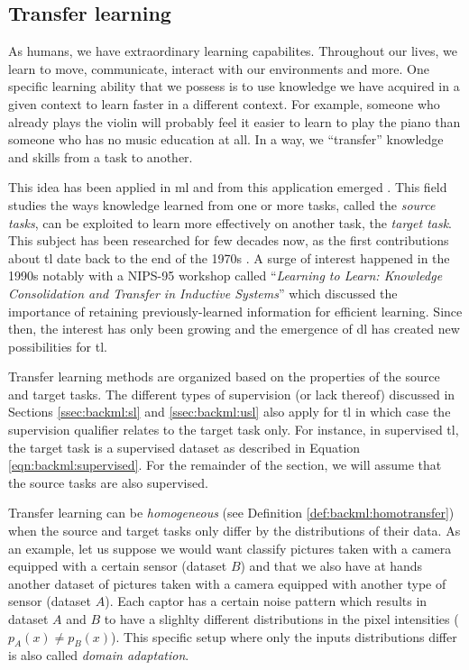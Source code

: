 \subsection{Transfer learning}
\label{ssec:backml:transfer}

As humans, we have extraordinary learning capabilites. Throughout our lives, we learn to move, communicate, interact with our environments and more. One specific learning ability that we possess is to use knowledge we have acquired in a given context to learn faster in a different context. For example, someone who already plays the violin will probably feel it easier to learn to play the piano than someone who has no music education at all. In a way, we ``transfer'' knowledge and skills from a task to another. 

This idea has been applied in \acrlong{ml} and from this application emerged  \parencite{yang2020transfer}. This field studies the ways knowledge learned from one or more tasks, called the \textit{source tasks}, can be exploited to learn more effectively on another task, the \textit{target task}. This subject has been researched for few decades now, as the first contributions about \acrlong{tl} date back to the end of the 1970s \parencite{bozinovski2020reminder}. A surge of interest happened in the 1990s notably with a NIPS-95 workshop called ``\textit{Learning to Learn: Knowledge Consolidation and Transfer in Inductive Systems}'' which discussed the importance of retaining previously-learned information for efficient learning. Since then, the interest has only been growing and the emergence of \acrlong{dl} has created new possibilities for \acrlong{tl}. 

Transfer learning methods are organized based on the properties of the source and target tasks. The different types of supervision (or lack thereof) discussed in Sections \ref{ssec:backml:sl} and \ref{ssec:backml:usl} also apply for \acrlong{tl} in which case the supervision qualifier relates to the target task only. For instance, in supervised \acrlong{tl}, the target task is a supervised dataset as described in Equation \ref{eqn:backml:supervised}. For the remainder of the section, we will assume that the source tasks are also supervised. 

Transfer learning can be \textit{homogeneous} (see Definition \ref{def:backml:homotransfer}) when the source and target tasks only differ by the distributions of their data. As an example, let us suppose we would want classify pictures taken with a camera equipped with a certain sensor (dataset $B$) and that we also have at hands another dataset of pictures taken with a camera equipped with another type of sensor (dataset $A$). Each captor has a certain noise pattern which results in dataset $A$ and $B$ to have a slighlty different distributions in the pixel intensities (\ie $p_A(x) \neq p_B(x)$). This specific setup where only the inputs distributions differ is also called \textit{domain adaptation}.  

